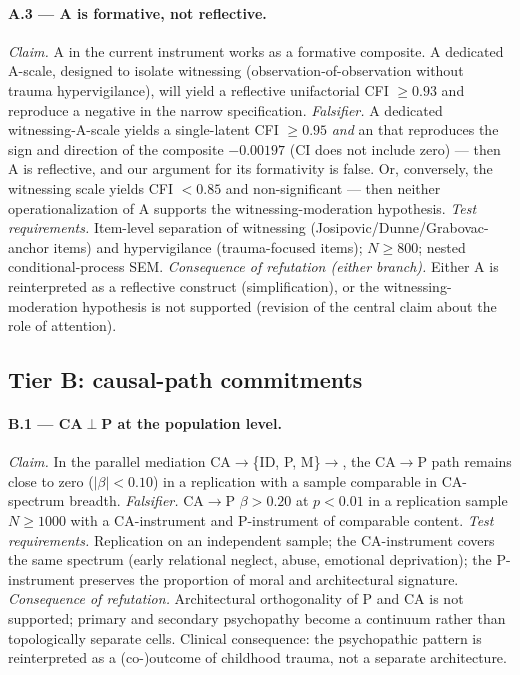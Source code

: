 \paragraph{A.3 --- A is formative, not reflective.}
\emph{Claim.} A in the current instrument works as a formative composite. A dedicated A-scale, designed to isolate witnessing (observation-of-observation without trauma hypervigilance), will yield a reflective unifactorial CFI $\geq 0.93$ and reproduce a negative \IMM{} in the narrow specification.
\emph{Falsifier.} A dedicated witnessing-A-scale yields a single-latent CFI $\geq 0.95$ \emph{and} an \IMM{} that reproduces the sign and direction of the composite $-0.00197$ (CI does not include zero) --- then A is reflective, and our argument for its formativity is false. Or, conversely, the witnessing scale yields CFI $< 0.85$ and non-significant \IMM{} --- then neither operationalization of A supports the witnessing-moderation hypothesis.
\emph{Test requirements.} Item-level separation of witnessing (Josipovic/Dunne/Grabovac-anchor items) and hypervigilance (trauma-focused items); $N \geq 800$; nested conditional-process SEM.
\emph{Consequence of refutation (either branch).} Either A is reinterpreted as a reflective construct (simplification), or the witnessing-moderation hypothesis is not supported (revision of the central claim about the role of attention).

\subsection{Tier B: causal-path commitments}
\label{subsec:falsification_tier_b}

\paragraph{B.1 --- CA$\perp$P at the population level.}
\emph{Claim.} In the parallel mediation CA$\to$\{ID, P, M\}$\to$\EAF{}, the CA$\to$P path remains close to zero ($|\beta| < 0.10$) in a replication with a sample comparable in CA-spectrum breadth.
\emph{Falsifier.} CA$\to$P $\beta > 0.20$ at $p < 0.01$ in a replication sample $N \geq 1000$ with a CA-instrument and P-instrument of comparable content.
\emph{Test requirements.} Replication on an independent sample; the CA-instrument covers the same spectrum (early relational neglect, abuse, emotional deprivation); the P-instrument preserves the proportion of moral and architectural signature.
\emph{Consequence of refutation.} Architectural orthogonality of P and CA is not supported; primary and secondary psychopathy become a continuum rather than topologically separate cells. Clinical consequence: the psychopathic pattern is reinterpreted as a (co-)outcome of childhood trauma, not a separate architecture.

